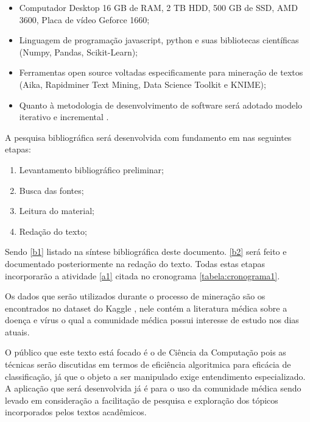 \documentclass[
	12pt,				%
	a4paper,			%
	english,			%
	brazil,				%
	]{article}
\begin{document}
    \begin{itemize}
        \item Computador Desktop 16 GB de RAM, 2 TB HDD, 500 GB de SSD, AMD 3600, Placa de v\' ideo Geforce 1660;
        \item Linguagem de programa\c c\~ ao javascript, python e suas bibliotecas cient\' ificas (Numpy, Pandas, Scikit-Learn);
        \item Ferramentas open source voltadas especificamente para minera\c c\~ ao de textos (Aika, Rapidminer Text Mining, Data Science Toolkit e KNIME);
        \item Quanto à metodologia de desenvolvimento de software ser\' a adotado modelo iterativo e incremental \cite{pressman2016engenharia}.
    \end{itemize}

   A pesquisa bibliogr\' afica ser\' a desenvolvida com fundamento em \cite{lakatos2001metodologia} nas seguintes etapas:
   \begin{enumerate}
        \item Levantamento bibliogr\' afico preliminar; \label{b1}
        \item Busca das fontes; \label{b2}
        \item Leitura do material; \label{b3}
        \item Reda\c c\~ ao do texto; \label{b4}
   \end{enumerate}
   
   Sendo \ref{b1} listado na síntese bibliogr\' afica deste documento. \ref{b2} ser\' a feito e documentado posteriormente na reda\c c\~ ao do texto. Todas estas etapas incorporar\~ ao a atividade \ref{a1} citada no cronograma \ref{tabela:cronograma1}.

    Os dados que ser\~ ao utilizados durante o processo de minera\c c\~ ao s\~ ao os encontrados no dataset do Kaggle \cite{kaggle20online}, nele cont\' em a literatura m\' edica sobre a doen\c ca e vírus o qual a comunidade m\' edica possui interesse de estudo nos dias atuais.

    O público que este texto est\' a focado \' e o de Ciência da Computa\c c\~ ao pois as t\' ecnicas ser\~ ao discutidas em termos de eficiência algoritmica para efic\' acia de classifica\c c\~ ao, j\' a que o objeto a ser manipulado exige entendimento especializado. A aplica\c c\~ ao que ser\' a desenvolvida j\' a \' e para o uso da comunidade m\' edica sendo levado em considera\c c\~ ao a facilita\c c\~ ao de pesquisa e explora\c c\~ ao dos tópicos incorporados pelos textos acadêmicos.
\end{document}
